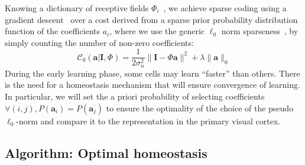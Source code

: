 \documentclass[a4paper, 11pt]{article} %
\newcommand{\coef}{\mathbf{a}} %
\newcommand{\image}{\mathbf{I}} %
\newcommand{\dico}{\Phi} %
\begin{document}


Knowing a dictionary of receptive fields $\dico_i$~\citep{hubel1968receptive}, we achieve sparse coding using a gradient descent~\citep{olshausen1996emergence,Olshausen97} over a  cost derived from a sparse prior probability distribution function of the coefficients $a_i$, where we use the generic $\ell_0$ norm sparseness~\citep{Perrinet10shl,Perrinet15bicv}, by simply counting the number of non-zero coefficients:
\begin{equation}%
\mathcal{C}_0( \coef | \image , \dico) = \frac{1}{2\sigma_n^2} \| \image - \dico \coef \|^2 + \lambda \| \coef \|_0 \nonumber%
\end{equation}%
During the early learning phase, some cells may learn ``faster'' than others. There is the need for a homeostasis mechanism that will ensure convergence of learning. In particular, we will set the a priori probability of selecting coefficients {\color{BrickRed} $\forall (i,j), P(\coef_i)=P(\coef_j)$} to ensure the optimality of the choice of the  pseudo $\ell_0$-norm and compare it to the representation in the primary visual cortex.%

\subsection{Algorithm: Optimal homeostasis}\label{HEH}
\end{document}
